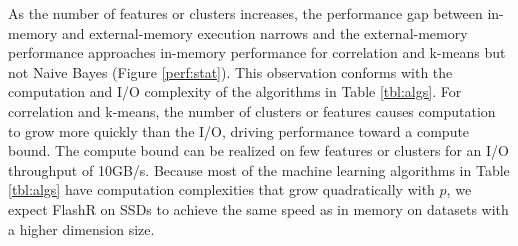 As the number of features or clusters increases, the performance gap between
in-memory and external-memory execution narrows and the external-memory
performance approaches in-memory performance for correlation and k-means
but not Naive Bayes (Figure \ref{perf:stat}). This observation conforms with
the computation and I/O complexity of the algorithms in Table \ref{tbl:algs}.
For correlation and k-means, the number of clusters or features causes computation
to grow more quickly than the I/O, driving performance toward a compute bound.
The compute bound can be realized on few features or clusters for an I/O throughput of 10GB/s.
Because most of the machine learning algorithms in Table \ref{tbl:algs} have
computation complexities that grow quadratically with $p$, we expect FlashR on SSDs to
achieve the same speed as in memory on datasets with a higher dimension size.


